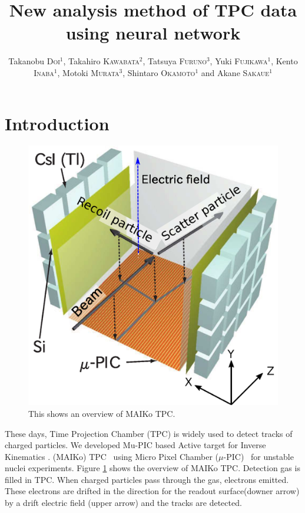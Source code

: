 \documentclass{jps-cp}
\title{New analysis method of TPC data using neural network}
\author{
  Takanobu \textsc{Doi}$^{1}$, Takahiro \textsc{Kawabata}$^{2}$, Tatsuya \textsc{Furuno}$^{3}$,
  Yuki \textsc{Fujikawa}$^{1}$, Kento \textsc{Inaba}$^{1}$, Motoki \textsc{Murata}$^{3}$,
  Shintaro \textsc{Okamoto}$^{1}$ and Akane \textsc{Sakaue}$^{1}$}
\begin{document}
\maketitle

\section{Introduction}
\begin{figure}
  \vspace{0zw}
  \centering
  \includegraphics[clip, width=16zw]{eps/MAIKo.eps}
  \caption{This shows an overview of MAIKo TPC.}
  \label{fig:MAIKo}
  \vspace{0zw}
\end{figure}
These days, Time Projection Chamber (TPC) is widely used to detect tracks of charged particles.
We developed Mu-PIC based Active target for Inverse Kinematics . (MAIKo) TPC~\cite{MAIKo}
using Micro Pixel Chamber ($\mu$-PIC)~\cite{mupic} for unstable nuclei experiments.
Figure \ref{fig:MAIKo} shows the overview of MAIKo TPC.
Detection gas is filled in TPC.
When charged particles pass through the gas, electrons emitted.
These electrons are drifted in the direction for the readout surface(downer arrow)
by a drift electric field (upper arrow) and the tracks are detected.
%
\end{document}
